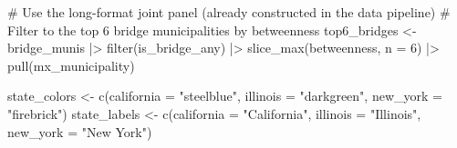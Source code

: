 \documentclass[
  11pt,
  letterpaper,
  DIV=11,
  numbers=noendperiod]{scrartcl}
\newenvironment{Shaded}{}{}
\newcommand{\AttributeTok}[1]{\textcolor[rgb]{0.84,0.23,0.29}{#1}}
\newcommand{\CommentTok}[1]{\textcolor[rgb]{0.42,0.45,0.49}{#1}}
\newcommand{\DecValTok}[1]{\textcolor[rgb]{0.00,0.36,0.77}{#1}}
\newcommand{\FunctionTok}[1]{\textcolor[rgb]{0.44,0.26,0.76}{#1}}
\newcommand{\NormalTok}[1]{\textcolor[rgb]{0.14,0.16,0.18}{#1}}
\newcommand{\OtherTok}[1]{\textcolor[rgb]{0.44,0.26,0.76}{#1}}
\newcommand{\SpecialCharTok}[1]{\textcolor[rgb]{0.00,0.36,0.77}{#1}}
\newcommand{\StringTok}[1]{\textcolor[rgb]{0.01,0.18,0.38}{#1}}
\begin{document}
\begin{Shaded}
\begin{Highlighting}[]
\CommentTok{\# Use the long{-}format joint panel (already constructed in the data pipeline)}
\CommentTok{\# Filter to the top 6 bridge municipalities by betweenness}
\NormalTok{top6\_bridges }\OtherTok{\textless{}{-}}\NormalTok{ bridge\_munis }\SpecialCharTok{|\textgreater{}}
  \FunctionTok{filter}\NormalTok{(is\_bridge\_any) }\SpecialCharTok{|\textgreater{}}
  \FunctionTok{slice\_max}\NormalTok{(betweenness, }\AttributeTok{n =} \DecValTok{6}\NormalTok{) }\SpecialCharTok{|\textgreater{}}
  \FunctionTok{pull}\NormalTok{(mx\_municipality)}

\NormalTok{state\_colors }\OtherTok{\textless{}{-}} \FunctionTok{c}\NormalTok{(}\AttributeTok{california =} \StringTok{"steelblue"}\NormalTok{, }\AttributeTok{illinois =} \StringTok{"darkgreen"}\NormalTok{, }\AttributeTok{new\_york =} \StringTok{"firebrick"}\NormalTok{)}
\NormalTok{state\_labels }\OtherTok{\textless{}{-}} \FunctionTok{c}\NormalTok{(}\AttributeTok{california =} \StringTok{"California"}\NormalTok{, }\AttributeTok{illinois =} \StringTok{"Illinois"}\NormalTok{,  }\AttributeTok{new\_york =} \StringTok{"New York"}\NormalTok{)}


\end{Highlighting}
\end{Shaded}
\end{document}
